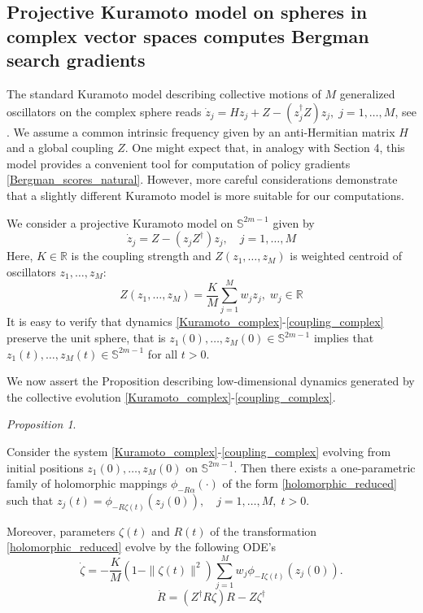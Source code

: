 \documentclass{article}
\theoremstyle{plain}%
\theoremstyle{definition}
\theoremstyle{remark}
\theoremstyle{prop}
\newtheorem{prop}{Proposition}
\begin{document}
 
 
\subsection{Projective Kuramoto model on spheres in complex vector spaces computes Bergman search gradients}

The standard Kuramoto model describing collective motions of $M$ generalized oscillators on the complex sphere reads $\dot z_j = H z_j + Z - (z_j^\dagger Z) z_j, \; j=1,\dots,M$, see \cite{LMS}. We assume a common intrinsic frequency given by an anti-Hermitian matrix $H$ and a global coupling $Z$. One might expect that, in analogy with Section 4, this model provides a convenient tool for computation of policy gradients \eqref{Bergman_scores_natural}. However, more careful considerations demonstrate that a slightly different Kuramoto model is more suitable for our computations.

We consider a projective Kuramoto model on ${\mathbb S}^{2m-1}$ given by 
\begin{equation}
\label{Kuramoto_complex}
\dot z_j = Z - (z_j Z^\dagger) z_j, \quad j=1,\dots,M
\end{equation}
Here, $K \in {\mathbb R}$ is the coupling strength and $Z(z_1,\dots,z_M)$ is weighted centroid of oscillators $z_1,\dots,z_M$:
\begin{equation}
\label{coupling_complex}
Z(z_1,\dots,z_M) = \frac{K}{M} \sum_{j=1}^M w_j z_j, \; w_j \in {\mathbb R}
\end{equation}
It is easy to verify that dynamics \eqref{Kuramoto_complex}-\eqref{coupling_complex} preserve the unit sphere, that is $z_1(0),\dots,z_M(0) \in \mathbb S^{2m-1}$ implies that $z_1(t),\dots,z_M(t) \in \mathbb S^{2m-1}$ for all $t>0$.


We now assert the Proposition describing low-dimensional dynamics generated by the collective evolution \eqref{Kuramoto_complex}-\eqref{coupling_complex}.

\begin{prop}
\label{low_dim_Bergman}

Consider the system \eqref{Kuramoto_complex}-\eqref{coupling_complex} evolving from initial positions $z_1(0),\dots,z_M(0)$ on ${\mathbb S}^{2m-1}$. Then there exists a one-parametric family of holomorphic mappings $\phi_{-R \alpha}(\cdot)$ of the form \eqref{holomorphic_reduced} such that
$z_j(t) = \phi_{-R \zeta(t)}(z_j(0)), \quad j=1,\dots,M, \; t>0$.

Moreover, parameters $\zeta(t)$ and $R(t)$ of the transformation \eqref{holomorphic_reduced} evolve by the following ODE's
\begin{equation}
\label{low_dim_Kuramoto_complex}
\dot \zeta = - \frac{K}{M} (1 - \| \zeta(t) \|^2) \sum_{j=1}^M w_j \phi_{-I \zeta(t)}(z_j(0)).
\end{equation}
\begin{equation}
\label{geom_phase}
\dot R = (Z^\dagger R \zeta) R - Z \zeta^\dagger
\end{equation}
\end{prop}
\end{document}
